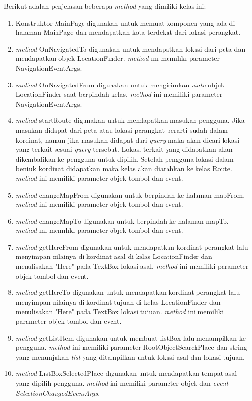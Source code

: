 Berikut adalah penjelasan beberapa \textit{method} yang dimiliki kelas ini:
\begin{enumerate}
	\item Konstruktor MainPage digunakan untuk memuat komponen yang ada di halaman MainPage dan mendapatkan kota terdekat dari lokasi perangkat.
	\item \textit{method} OnNavigatedTo digunakan untuk mendapatkan lokasi dari peta dan mendapatkan objek LocationFinder. \textit{method} ini memiliki parameter NavigationEventArgs.
	\item \textit{method} OnNavigatedFrom digunakan untuk mengirimkan \textit{state} objek LocationFinder saat berpindah kelas. \textit{method} ini memiliki parameter NavigationEventArgs.
	\item \textit{method} startRoute digunakan untuk mendapatkan masukan pengguna. Jika masukan didapat dari peta atau lokasi perangkat berarti sudah dalam kordinat, namun jika masukan didapat dari \textit{query} maka akan dicari lokasi yang terkait sesuai \textit{query} tersebut. Lokasi terkait yang didapatkan akan dikembalikan ke pengguna untuk dipilih. Setelah pengguna lokasi dalam bentuk kordinat didapatkan maka kelas akan diarahkan ke kelas Route. \textit{method} ini memiliki parameter objek tombol dan event.
	\item \textit{method} changeMapFrom digunakan untuk berpindah ke halaman mapFrom. \textit{method} ini memiliki parameter objek tombol dan event.
	\item \textit{method} changeMapTo digunakan untuk berpindah ke halaman mapTo. \textit{method} ini memiliki parameter objek tombol dan event.
	\item \textit{method} getHereFrom digunakan untuk mendapatkan kordinat perangkat lalu menyimpan nilainya di kordinat asal di kelas LocationFinder dan menulisakan "Here" pada TextBox lokasi asal. \textit{method} ini memiliki parameter objek tombol dan event.
	\item \textit{method} getHereTo digunakan untuk mendapatkan kordinat perangkat lalu menyimpan nilainya di kordinat tujuan di kelas LocationFinder dan menulisakan "Here" pada TextBox lokasi tujuan. \textit{method} ini memiliki parameter objek tombol dan event.
	\item \textit{method} getListItem digunakan untuk membuat listBox lalu menampilkan ke pengguna. \textit{method} ini memiliki parameter RootObjectSearchPlace dan string yang menunjukan \textit{list} yang ditampilkan untuk lokasi asal dan lokasi tujuan. 
	\item \textit{method} ListBoxSelectedPlace digunakan untuk mendapatkan tempat asal yang dipilih pengguna. \textit{method} ini memiliki parameter objek dan \textit{event SelectionChangedEventArgs}. 

\end{enumerate}
